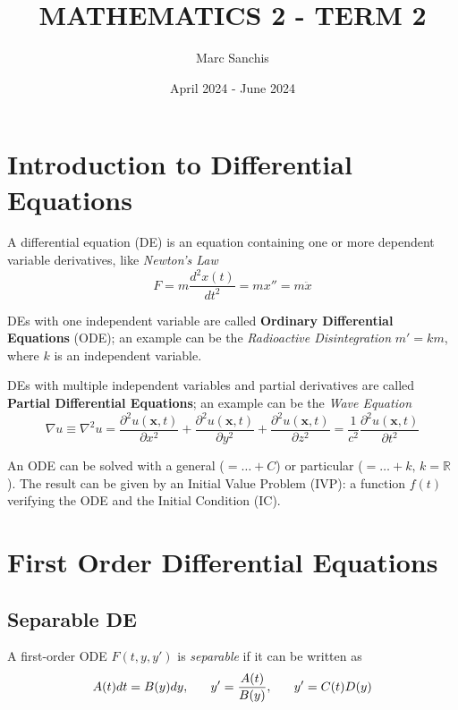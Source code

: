 \documentclass[a4paper]{article}
\title{MATHEMATICS 2 - TERM 2}
\author{Marc Sanchis}
\date{April 2024 - June 2024}
\begin{document}
\maketitle

\renewcommand{\contentsname}{}
\tableofcontents

\newpage
\restoregeometry
\pagestyle{fancy}

\section{Introduction to Differential Equations}

A differential equation (DE) is an equation containing one or more dependent variable derivatives, like \textit{Newton's Law}
$$
F=m \frac{d^{2}x(t)}{dt^{2}}=mx''=m\ddot{x}
$$

DEs with one independent variable are called \textbf{Ordinary Differential Equations} (ODE); an example can be the \textit{Radioactive Disintegration} $m'=km$, where $k$ is an independent variable.

DEs with multiple independent variables and partial derivatives are called \textbf{Partial Differential Equations}; an example can be the \textit{Wave Equation}
$$
\nabla u\equiv\nabla^{2}u=\frac{\partial^{2}u(\mathbf{x}, t)}{\partial x^{2}}+\frac{\partial^{2}u(\mathbf{x},t)}{\partial y^{2}}+\frac{\partial^{2}u(\mathbf{x},t)}{\partial z^{2}}=\frac{1}{c^{2}}\frac{\partial^{2}u(\mathbf{x},t)}{\partial t^{2}}
$$


An ODE can be solved with a general ($=\dots+C$) or particular ($=\dots+k,\,k=\mathbb{R}$). The result can be given by an Initial Value Problem (IVP): a function $f(t)$ verifying the ODE and the Initial Condition (IC).


\section{First Order Differential Equations}

\subsection{Separable DE}
A first-order ODE $F(t,y,y')$ is \textit{separable} if it can be written as
$$
A(t)dt=B(y)dy,\hspace{4ex}y'=\frac{A(t)}{B(y)},\hspace{4ex}y'=C(t)D(y)
$$
\end{document}
